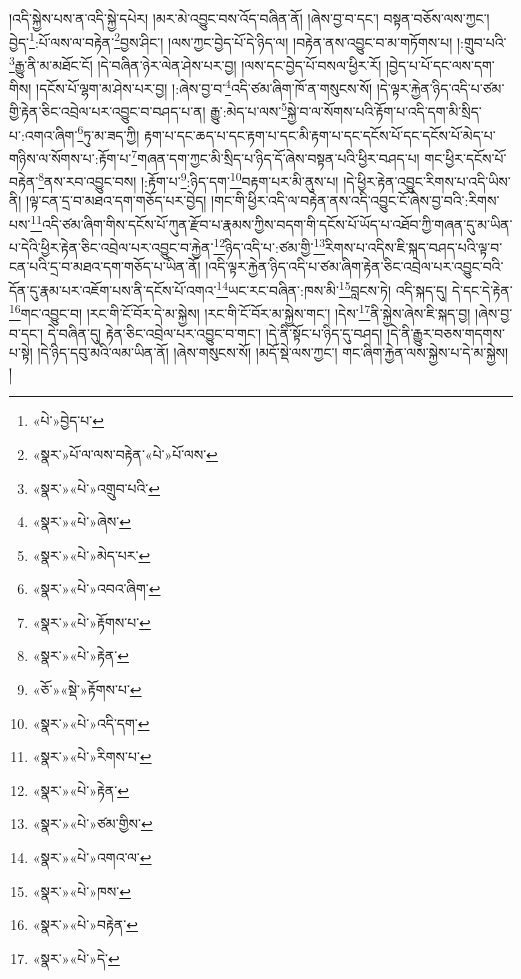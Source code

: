 །འདི་སྐྱེས་པས་ན་འདི་སྐྱེ་དཔེར། །མར་མེ་འབྱུང་བས་འོད་བཞིན་ནོ། །ཞེས་བྱ་བ་དང་། བསྟན་བཅོས་ལས་ཀྱང་། བྱེད་\footnote{«པེ་»བྱེད་པ་}:པོ་ལས་ལ་བརྟེན་\footnote{«སྣར་»པོ་ལ་ལས་བརྟེན་«པེ་»པོ་ལས་}བྱས་ཤིང་། །ལས་ཀྱང་བྱེད་པོ་དེ་ཉིད་ལ། །བརྟེན་ནས་འབྱུང་བ་མ་གཏོགས་པ། །:གྲུབ་པའི་\footnote{«སྣར་»«པེ་»འགྲུབ་པའི་}རྒྱུ་ནི་མ་མཐོང་ངོ། །དེ་བཞིན་ཉེར་ལེན་ཤེས་པར་བྱ། །ལས་དང་བྱེད་པོ་བསལ་ཕྱིར་རོ། །བྱེད་པ་པོ་དང་ལས་དག་གིས། །དངོས་པོ་ལྷག་མ་ཤེས་པར་བྱ། །:ཞེས་བྱ་བ་\footnote{«སྣར་»«པེ་»ཞེས་}འདི་ཙམ་ཞིག་ཁོ་ན་གསུངས་སོ། །དེ་ལྟར་རྐྱེན་ཉིད་འདི་པ་ཙམ་གྱི་རྟེན་ཅིང་འབྲེལ་པར་འབྱུང་བ་བཤད་པ་ན། རྒྱུ་:མེད་པ་ལས་\footnote{«སྣར་»«པེ་»མེད་པར་}སྐྱེ་བ་ལ་སོགས་པའི་རྟོག་པ་འདི་དག་མི་སྲིད་པ་:འགའ་ཞིག་\footnote{«སྣར་»«པེ་»འབའ་ཞིག་}ཏུ་མ་ཟད་ཀྱི། རྟག་པ་དང་ཆད་པ་དང་རྟག་པ་དང་མི་རྟག་པ་དང་དངོས་པོ་དང་དངོས་པོ་མེད་པ་གཉིས་ལ་སོགས་པ་:རྟོག་པ་\footnote{«སྣར་»«པེ་»རྟོགས་པ་}གཞན་དག་ཀྱང་མི་སྲིད་པ་ཉིད་དོ་ཞེས་བསྟན་པའི་ཕྱིར་བཤད་པ། གང་ཕྱིར་དངོས་པོ་བརྟེན་\footnote{«སྣར་»«པེ་»རྟེན་}ནས་རབ་འབྱུང་བས། །:རྟོག་པ་\footnote{«ཅོ་»«སྡེ་»རྟོགས་པ་}:ཉིད་དག་\footnote{«སྣར་»«པེ་»འདི་དག་}བརྟག་པར་མི་ནུས་པ། །དེ་ཕྱིར་རྟེན་འབྱུང་རིགས་པ་འདི་ཡིས་ནི། །ལྟ་ངན་དྲ་བ་མཐའ་དག་གཅོད་པར་བྱེད། །གང་གི་ཕྱིར་འདི་ལ་བརྟེན་ནས་འདི་འབྱུང་ངོ་ཞེས་བྱ་བའི་:རིགས་པས་\footnote{«སྣར་»«པེ་»རིགས་པ་}འདི་ཙམ་ཞིག་གིས་དངོས་པོ་ཀུན་རྫོབ་པ་རྣམས་ཀྱིས་བདག་གི་དངོས་པོ་ཡོད་པ་འཐོབ་ཀྱི་གཞན་དུ་མ་ཡིན་པ་དེའི་ཕྱིར་རྟེན་ཅིང་འབྲེལ་པར་འབྱུང་བ་རྐྱེན་\footnote{«སྣར་»«པེ་»རྟེན་}ཉིད་འདི་པ་:ཙམ་གྱི་\footnote{«སྣར་»«པེ་»ཙམ་གྱིས་}རིགས་པ་འདིས་ཇི་སྐད་བཤད་པའི་ལྟ་བ་ངན་པའི་དྲ་བ་མཐའ་དག་གཅོད་པ་ཡིན་ནོ། །འདི་ལྟར་རྐྱེན་ཉིད་འདི་པ་ཙམ་ཞིག་རྟེན་ཅིང་འབྲེལ་པར་འབྱུང་བའི་དོན་དུ་རྣམ་པར་འཇོག་པས་ནི་དངོས་པོ་འགའ་\footnote{«སྣར་»«པེ་»འགའ་ལ་}ཡང་རང་བཞིན་:ཁས་མི་\footnote{«སྣར་»«པེ་»ཁས་}བླངས་ཏེ། འདི་སྐད་དུ། དེ་དང་དེ་རྟེན་\footnote{«སྣར་»«པེ་»བརྟེན་}གང་འབྱུང་བ། །རང་གི་ངོ་བོར་དེ་མ་སྐྱེས། །རང་གི་ངོ་བོར་མ་སྐྱེས་གང་། །དེས་\footnote{«སྣར་»«པེ་»དེ་}ནི་སྐྱེས་ཞེས་ཇི་སྐད་བྱ། །ཞེས་བྱ་བ་དང་། དེ་བཞིན་དུ། རྟེན་ཅིང་འབྲེལ་པར་འབྱུང་བ་གང་། །དེ་ནི་སྟོང་པ་ཉིད་དུ་བཤད། །དེ་ནི་རྒྱུར་བཅས་གདགས་པ་སྟེ། །དེ་ཉིད་དབུ་མའི་ལམ་ཡིན་ནོ། །ཞེས་གསུངས་སོ། །མདོ་སྡེ་ལས་ཀྱང་། གང་ཞིག་རྐྱེན་ལས་སྐྱེས་པ་དེ་མ་སྐྱེས། །
